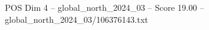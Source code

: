 \begin{textsample}{POS Dim 4 – global\_north\_2024\_03 – Score 19.00 – global\_north\_2024\_03/106376143.txt}
\end{textsample}

